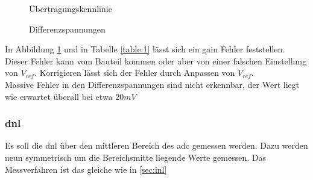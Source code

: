 \documentclass[12pt, a4paper, ngerman]{article}
\begin{document}
\begin{figure}[h]
  \caption{Übertragungskennlinie}
  \label{plot:inl}
\end{figure}

\begin{figure}[h]
  \caption{Differenzspannungen}
  \label{plot:res1}
\end{figure}


In Abbildung \ref{plot:inl} und in Tabelle \ref{table:1} lässt sich ein gain Fehler feststellen.
Dieser Fehler kann vom Bauteil kommen oder aber von einer falschen Einstellung von $V_{ref}$.
Korrigieren lässt sich der Fehler durch Anpassen von $V_{ref}$. \\
Massive Fehler in den Differenzspannungen sind nicht erkennbar, der Wert liegt wie erwartet überall bei etwa $20mV$

\subsubsection{\acl{dnl}}

Es soll die \ac{dnl} über den mittleren Bereich des \ac{adc} gemessen werden.
Dazu werden neun symmetrisch um die Bereichsmitte liegende Werte gemessen.
Das Messverfahren ist das gleiche wie in \ref{sec:inl}
\end{document}
